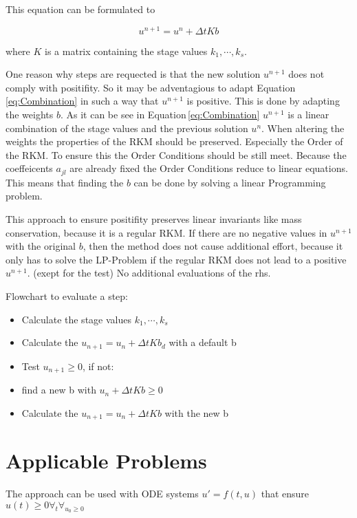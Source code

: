 \documentclass{article}
\begin{document}
This equation can be formulated to

\begin{equation}\label{eq:Combination}
u^{n+1} = u^n + \Delta t K b
\end{equation}

where $K$ is a matrix containing the stage values $k_1,\cdots,k_s$.

One reason why steps are requected is that the new solution $u^{n+1}$ does not comply with positifity. 
So it may be adventagious to adapt Equation\,\ref{eq:Combination} in such a way that $u^{n+1}$ is positive. This is done by adapting the weights $b$.
As it can be see in Equation\,\ref{eq:Combination} $u^{n+1}$ is a linear combination of the stage values and the previous solution $u^n$.
When altering the weights the properties of the RKM should be preserved. Especially the Order of the RKM.  
To ensure this the Order Conditions should be still meet. 
Because the coeffeicents $a_{jl}$ are already fixed the Order Conditions reduce to linear equations.
This means that finding the $b$ can be done by solving a linear Programming problem.
 
This approach to ensure positifity preserves linear invariants like mass conservation, because it is a regular RKM. 
If there are no negative values in $u^{n+1}$ with the original $b$, then the method does not cause additional effort, because it only has to solve the LP-Problem if the regular RKM does not lead to a positive $u^{n+1}$. (exept for the test)
No additional evaluations of the rhs.

Flowchart to evaluate a step:

\begin{itemize}
\item Calculate the stage values $k_1,\cdots,k_s$
\item Calculate the $u_{n+1} = u_n + \Delta t K b_{d}$ with a default b
\item Test $u_{n+1} \geq 0$, if not:
\item find a new b with $u_n + \Delta t K b \geq 0$
\item Calculate the $u_{n+1} = u_n + \Delta t K b$ with the new b
\end{itemize}


\section{Applicable Problems}
The approach can be used with ODE systems $u' = f(t,u)$ that ensure  $u(t) \geq 0 \forall_t \forall_{  u_0 \geq 0}$ 
\end{document}
